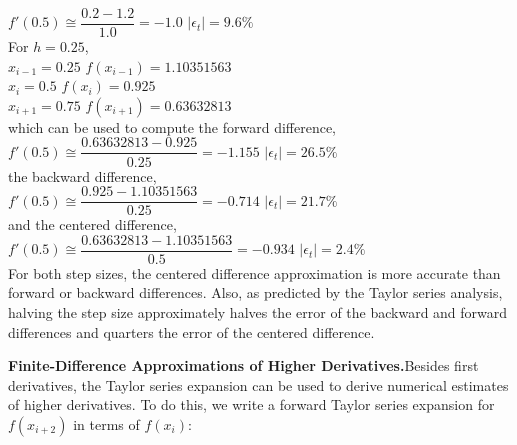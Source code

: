 \documentclass[../main.tex]{subfiles}
\begin{document}
\begin{example}
    $f'(0.5)\cong\dfrac{0.2-1.2}{1.0}=-1.0$\hspace{10mm} $\left\lvert\epsilon_t \right\rvert = 9.6\%$\\

    \noindent
    For $h=0.25$,\\

    $x_{i-1}=0.25$\hspace{10mm} $f(x_{i-1})=1.10351563$\\

    $x_i=0.5$ \hspace{14mm} $f(x_i) = 0.925$\\

    $x_{i+1}=0.75$\hspace{10mm} $f(x_{i+1}) = 0.63632813$\\

    \noindent
    which can be used to compute the forward difference,\\

    $f'(0.5)\cong\dfrac{0.63632813 - 0.925}{0.25}=-1.155$\hspace{10mm} $\left\lvert\epsilon_t \right\rvert = 26.5\%$\\

    \noindent
    the backward difference,\\

    $f'(0.5)\cong\dfrac{0.925 - 1.10351563}{0.25}=-0.714$\hspace{10mm} $\left\lvert\epsilon_t \right\rvert = 21.7\%$\\

    \noindent
    and the centered difference,\\

    $f'(0.5)\cong\dfrac{0.63632813 - 1.10351563}{0.5}=-0.934$\hspace{10mm} $\left\lvert\epsilon_t \right\rvert = 2.4\%$\\


    For both step sizes, the centered difference approximation is more accurate than forward
    or backward differences. Also, as predicted by the Taylor series analysis, halving the
    step size approximately halves the error of the backward and forward differences and quarters
    the error of the centered difference.\\
\end{example}

\noindent
\textbf{Finite-Difference Approximations of Higher Derivatives.}\quad Besides first derivatives, the
Taylor series expansion can be used to derive numerical estimates of higher derivatives. To
do this, we write a forward Taylor series expansion for $f (x_{i+2})$ in terms of $f (x_i)$:\\
\end{document}
